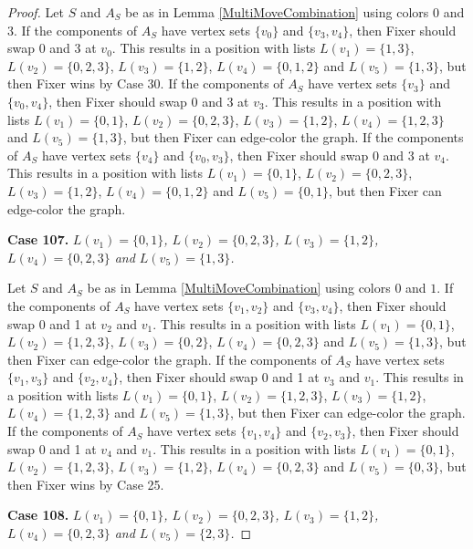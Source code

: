 \documentclass[12pt]{amsart}
\theoremstyle{plain}
\theoremstyle{definition}
\theoremstyle{remark}
\begin{document}
\begin{proof}
Let $S$ and $A_S$ be as in Lemma \ref{MultiMoveCombination} using colors $0$ and $3$. If the components of $A_S$ have vertex sets $\{v_0\}$ and $\{v_3, v_4\}$, then Fixer should swap 0 and 3 at $v_0$. This results in a position with lists $L(v_1) = \{1, 3\}$, $L(v_2) = \{0, 2, 3\}$, $L(v_3) = \{1, 2\}$, $L(v_4) = \{0, 1, 2\}$ and $L(v_5) = \{1, 3\}$, but then Fixer wins by Case 30.
If the components of $A_S$ have vertex sets $\{v_3\}$ and $\{v_0, v_4\}$, then Fixer should swap 0 and 3 at $v_3$. This results in a position with lists $L(v_1) = \{0, 1\}$, $L(v_2) = \{0, 2, 3\}$, $L(v_3) = \{1, 2\}$, $L(v_4) = \{1, 2, 3\}$ and $L(v_5) = \{1, 3\}$, but then Fixer can edge-color the graph.
If the components of $A_S$ have vertex sets $\{v_4\}$ and $\{v_0, v_3\}$, then Fixer should swap 0 and 3 at $v_4$. This results in a position with lists $L(v_1) = \{0, 1\}$, $L(v_2) = \{0, 2, 3\}$, $L(v_3) = \{1, 2\}$, $L(v_4) = \{0, 1, 2\}$ and $L(v_5) = \{0, 1\}$, but then Fixer can edge-color the graph.

\noindent\textbf{Case 107.  }\textit{$L(v_1) = \{0, 1\}$, $L(v_2) = \{0, 2, 3\}$, $L(v_3) = \{1, 2\}$, $L(v_4) = \{0, 2, 3\}$ and $L(v_5) = \{1, 3\}$.}

Let $S$ and $A_S$ be as in Lemma \ref{MultiMoveCombination} using colors $0$ and $1$. If the components of $A_S$ have vertex sets $\{v_1, v_2\}$ and $\{v_3, v_4\}$, then Fixer should swap 0 and 1 at $v_2$ and $v_1$. This results in a position with lists $L(v_1) = \{0, 1\}$, $L(v_2) = \{1, 2, 3\}$, $L(v_3) = \{0, 2\}$, $L(v_4) = \{0, 2, 3\}$ and $L(v_5) = \{1, 3\}$, but then Fixer can edge-color the graph.
If the components of $A_S$ have vertex sets $\{v_1, v_3\}$ and $\{v_2, v_4\}$, then Fixer should swap 0 and 1 at $v_3$ and $v_1$. This results in a position with lists $L(v_1) = \{0, 1\}$, $L(v_2) = \{1, 2, 3\}$, $L(v_3) = \{1, 2\}$, $L(v_4) = \{1, 2, 3\}$ and $L(v_5) = \{1, 3\}$, but then Fixer can edge-color the graph.
If the components of $A_S$ have vertex sets $\{v_1, v_4\}$ and $\{v_2, v_3\}$, then Fixer should swap 0 and 1 at $v_4$ and $v_1$. This results in a position with lists $L(v_1) = \{0, 1\}$, $L(v_2) = \{1, 2, 3\}$, $L(v_3) = \{1, 2\}$, $L(v_4) = \{0, 2, 3\}$ and $L(v_5) = \{0, 3\}$, but then Fixer wins by Case 25.

\noindent\textbf{Case 108.  }\textit{$L(v_1) = \{0, 1\}$, $L(v_2) = \{0, 2, 3\}$, $L(v_3) = \{1, 2\}$, $L(v_4) = \{0, 2, 3\}$ and $L(v_5) = \{2, 3\}$.}


\end{proof}
\end{document}
